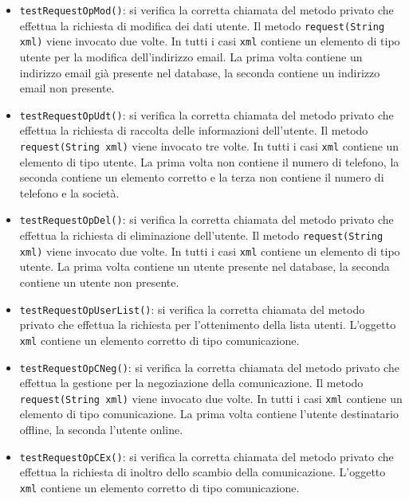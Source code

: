 {\begin{sloppypar}
{\begin{itemize}
\begin{itemize}
\begin{itemize}
						\item \texttt{testRequestOpMod()}: si verifica la corretta chiamata del metodo privato che effettua la richiesta di modifica dei dati utente. Il metodo \texttt{request(String xml)} viene invocato due volte. In tutti i casi \texttt{xml} contiene un elemento di tipo utente per la modifica dell'indirizzo email. La prima volta contiene un indirizzo email già presente nel database, la seconda contiene un indirizzo email non presente.
						
						\item \texttt{testRequestOpUdt()}: si verifica la corretta chiamata del metodo privato che effettua la richiesta di raccolta delle informazioni dell'utente. Il metodo \texttt{request(String xml)} viene invocato tre volte. In tutti i casi \texttt{xml} contiene un elemento di tipo utente. La prima volta non contiene il numero di telefono, la seconda contiene un elemento corretto e la terza non contiene il numero di telefono e la società.
						
						\item \texttt{testRequestOpDel()}: si verifica la corretta chiamata del metodo privato che effettua la richiesta di eliminazione dell'utente. Il metodo \texttt{request(String xml)} viene invocato due volte. In tutti i casi \texttt{xml} contiene un elemento di tipo utente. La prima volta contiene un utente presente nel database, la seconda contiene un utente non presente.
						
						\item \texttt{testRequestOpUserList()}: si verifica la corretta chiamata del metodo privato che effettua la richiesta per l'ottenimento della lista utenti. L'oggetto \texttt{xml} contiene un elemento corretto di tipo comunicazione.
						
						\item \texttt{testRequestOpCNeg()}: si verifica la corretta chiamata del metodo privato che effettua la gestione per la negoziazione della comunicazione. Il metodo \texttt{request(String xml)} viene invocato due volte. In tutti i casi \texttt{xml} contiene un elemento di tipo comunicazione. La prima volta contiene l'utente destinatario offline, la seconda l'utente online.
						
						\item \texttt{testRequestOpCEx()}: si verifica la corretta chiamata del metodo privato che effettua la richiesta di inoltro dello scambio della comunicazione. L'oggetto \texttt{xml} contiene un elemento corretto di tipo comunicazione.
						

\end{itemize}
\end{itemize}
\end{itemize}}
\end{sloppypar}}
